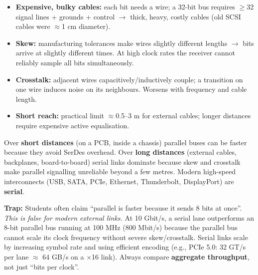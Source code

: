 \documentclass[11pt]{article}
\newcommand{\cle}[1]{{\popxbold\color{popdark}#1}}
\newcounter{popsec}
\newcounter{popsub}
\newcommand{\courssub}[1]{%
  \stepcounter{popsub}%
  \par\vspace{9pt}\noindent{\popxbold\fontsize{11.5}{13}\selectfont\color{popink}{\color{poporange}\thepopsec.\thepopsub}\hspace{6pt}#1}\par\nopagebreak\vspace{4pt}
}
\begin{document}
\begin{aretenir}
\begin{itemize}
\item \textbf{Expensive, bulky cables:} each bit needs a wire; a 32-bit bus requires $\ge$32 signal lines + grounds + control $\rightarrow$ thick, heavy, costly cables (old SCSI cables were $\approx$1 cm diameter).
\item \textbf{\cle{Skew}:} manufacturing tolerances make wires slightly different lengths $\rightarrow$ bits arrive at slightly different times. At high clock rates the receiver cannot reliably sample all bits simultaneously.
\item \textbf{\cle{Crosstalk}:} adjacent wires capacitively/inductively couple; a transition on one wire induces noise on its neighbours. Worsens with frequency and cable length.
\item \textbf{Short reach:} practical limit $\approx$0.5–3 m for external cables; longer distances require expensive active equalisation.
\end{itemize}
\end{aretenir}

\courssub{Comparison and Modern Trends}

\begin{propriete}
Over \textbf{short distances} (on a PCB, inside a chassis) parallel buses can be faster because they avoid SerDes overhead. Over \textbf{long distances} (external cables, backplanes, board-to-board) serial links dominate because skew and crosstalk make parallel signalling unreliable beyond a few metres. Modern high-speed interconnects (USB, SATA, PCIe, Ethernet, Thunderbolt, DisplayPort) are \textbf{serial}.
\end{propriete}

\begin{attention}
\textbf{Trap:} Students often claim “parallel is faster because it sends 8 bits at once”. \emph{This is false for modern external links.} At 10 Gbit/s, a serial lane outperforms an 8-bit parallel bus running at 100 MHz (800 Mbit/s) because the parallel bus cannot scale its clock frequency without severe skew/crosstalk. Serial links scale by increasing symbol rate and using efficient encoding (e.g., PCIe 5.0: 32 GT/s per lane $\approx$ 64 GB/s on a $\times$16 link). Always compare \textbf{aggregate throughput}, not just “bits per clock”.
\end{attention}
\end{document}
